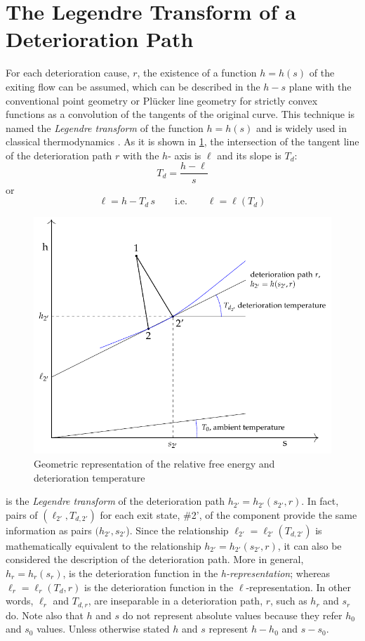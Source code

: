 \documentclass[energies,article,submit,moreauthors,pdftex]{Definitions/mdpi}
\begin{document}
\section{The Legendre Transform of a Deterioration Path}
For each deterioration cause, $r$, the existence of a function $h = h(s)$ of the exiting flow can be assumed, which can be described in the $h-s$ plane with the conventional point geometry or Plücker line geometry for strictly convex functions as a convolution of the tangents of the original curve. This technique is named the \emph{Legendre transform} of the function $h = h(s)$ and is widely used in classical thermodynamics \cite{Callen1985,Alberty2001}. As it is shown in \cref{fig:rfe}, the intersection of the tangent line of the deterioration path $r$  with the $h$- axis is $\ell$ and its slope is $T_d$:
\[
T_d=\frac{h-\ell}{s}
\]
or
\begin{equation}
\ell=h-T_d\,s \qquad \text{i.e.} \qquad \ell=\ell(T_d)
\label{eq:lgdr}
\end{equation}

\begin{figure}[ht]
	\centering
	\includegraphics[scale=0.78]{rfe.pdf}
	\caption{Geometric representation of the relative free energy and deterioration temperature}
	\label{fig:rfe}
\end{figure}

 is the \emph{Legendre transform} of the deterioration path $h_{2'}=h_{2'}(s_{2'},r)$. In fact, pairs of $(\ell_{2'} , T_{d,2'})$ for each exit state, \#2', of the component provide the same information as pairs $(h_{2'},s_{2'}$). Since the relationship  $\ell_{2'} = \ell_{2'}(T_{d,2'})$ is mathematically equivalent to the relationship $h_{2'} = h_{2'} (s_{2'}, r)$, it can also be considered the description of the deterioration path. More in general, $h_r=h_r (s_r)$, is the deterioration function in the \emph{h-representation}; whereas $\ell_r = \ell_r(T_d,r)$ is the deterioration function in the $\ell$-representation. In other words, $\ell_r$ and $T_{d,r}$, are inseparable in a deterioration path, $r$, such as $h_r$ and $s_r$ do. Note also that $h$ and $s$ do not represent absolute values because they refer $h_0$ and $s_0$ values. Unless otherwise stated $h$ and $s$ represent $h-h_0$ and $s-s_0$.
\end{document}

